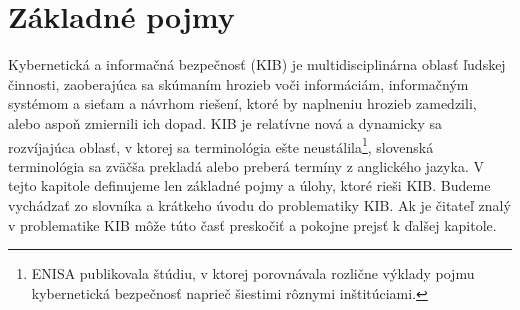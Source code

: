 \chapter{Základné pojmy}

Kybernetická a informačná bezpečnosť (KIB) je multidisciplinárna oblasť ľudskej činnosti, zaoberajúca sa skúmaním
hrozieb voči informáciám, informačným systémom a sieťam a návrhom riešení, ktoré by naplneniu hrozieb zamedzili,
alebo aspoň zmiernili ich dopad. KIB je relatívne nová a dynamicky sa rozvíjajúca oblasť, v ktorej sa terminológia ešte
neustálila\footnote{\acrshort{ENISA} publikovala štúdiu, v ktorej porovnávala rozlične výklady pojmu kybernetická
bezpečnosť naprieč šiestimi rôznymi inštitúciami.}, slovenská terminológia sa zväčša prekladá alebo preberá termíny
z anglického jazyka. V tejto kapitole definujeme len základné pojmy a úlohy, ktoré rieši KIB. Budeme vychádzať zo slovníka a
krátkeho úvodu do problematiky \acrshort{KIB}\cite{KUDIKB-MVS}. Ak je čitateľ znalý v problematike \acrshort{KIB} môže
túto časť preskočiť a pokojne prejsť k ďalšej kapitole. 



